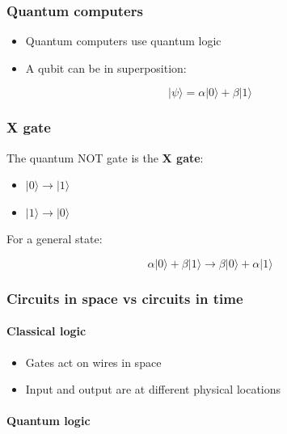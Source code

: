 \documentclass[
]{article}
\providecommand{\tightlist}{%
  \setlength{\itemsep}{0pt}\setlength{\parskip}{0pt}}
\begin{document}
\subsubsection{Quantum computers}\label{quantum-computers-1}

\begin{itemize}
\tightlist
\item
  Quantum computers use quantum logic
\item
  A qubit can be in superposition:
\end{itemize}

\[
|\psi\rangle = \alpha|0\rangle + \beta|1\rangle
\]

\subsubsection{X gate}\label{x-gate}

The quantum NOT gate is the \textbf{X gate}:

\begin{itemize}
\tightlist
\item
  $|0\rangle \to |1\rangle$
\item
  $|1\rangle \to |0\rangle$
\end{itemize}

For a general state:

\[
\alpha|0\rangle + \beta|1\rangle \to \beta|0\rangle + \alpha|1\rangle
\]

\subsubsection{Circuits in space vs circuits in
time}\label{circuits-in-space-vs-circuits-in-time}

\paragraph{Classical logic}\label{classical-logic}

\begin{itemize}
\tightlist
\item
  Gates act on wires in space
\item
  Input and output are at different physical locations
\end{itemize}

\paragraph{Quantum logic}\label{quantum-logic}
\end{document}
